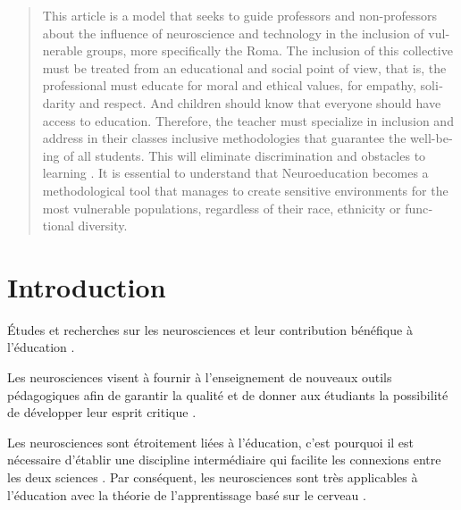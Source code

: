 \documentclass[french]{textolivre}
\begin{document}
\begin{polyabstract}
\begin{portuguese}
\begin{abstract}
\end{abstract}
\end{portuguese}

\begin{english}
\begin{abstract}
This article is a model that seeks to guide professors and non-professors about the influence of neuroscience and technology in the inclusion of vulnerable groups, more specifically the Roma. The inclusion of this collective must be treated from an educational and social point of view, that is, the professional must educate for moral and ethical values, for empathy, solidarity and respect. And children should know that everyone should have access to education. Therefore, the teacher must specialize in inclusion and address in their classes inclusive methodologies that guarantee the well-being of all students. This will eliminate discrimination and obstacles to learning \cite{echeita_sarrionandia_pandemia_2020}. It is essential to understand that Neuroeducation becomes a methodological tool that manages to create sensitive environments for the most vulnerable populations, regardless of their race, ethnicity or functional diversity.

\end{abstract}
\end{english}
\end{polyabstract}

\section{Introduction}\label{sec-intro}
Études et recherches sur les neurosciences et leur contribution bénéfique à l'éducation \cite{ruiz_diaz_aportes_2020}.

Les neurosciences visent à fournir à l'enseignement de nouveaux outils pédagogiques afin de garantir la qualité et de donner aux étudiants la possibilité de développer leur esprit critique \cite{rosell_aiquel_neurociencia_2020}.

Les neurosciences sont étroitement liées à l'éducation, c'est pourquoi il est nécessaire d'établir une discipline intermédiaire qui facilite les connexions entre les deux sciences \cite{carnine_professional_1995}. Par conséquent, les neurosciences sont très applicables à l'éducation avec la théorie de l'apprentissage basé sur le cerveau \cite{rosell_aiquel_neurociencia_2020}.
\end{document}
